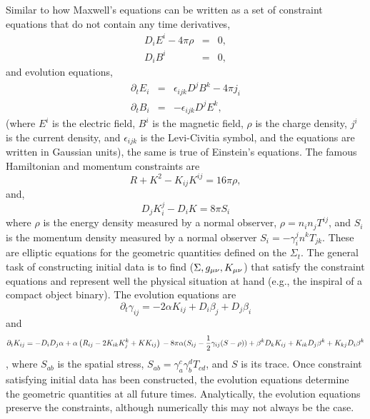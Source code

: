 Similar to how Maxwell's equations can be written as a set of constraint equations that do not contain any time derivatives,
\begin{eqnarray}
D_iE^i -4\pi\rho &=& 0, \\
D_iB^i &=& 0,
\end{eqnarray}
and evolution equations,
\begin{eqnarray}
\partial_tE_i&=&\epsilon_{ijk}D^jB^k - 4\pi j_i\\
\partial_tB_i&=&-\epsilon_{ijk}D^jE^k,
\end{eqnarray}
(where $E^i$ is the electric field, $B^i$ is the magnetic field, $\rho$ is the charge density, $j^i$ is the current density, and $\epsilon_{ijk}$ is the Levi-Civitia symbol, and the equations are written in Gaussian units), the same is true of Einstein's equations. The famous Hamiltonian and momentum constraints are
\begin{equation}
R+K^2-K_{ij}K^{ij}=16\pi\rho,
\end{equation}
and,
\begin{equation}
D_{j}K^{j}_{i}-D_iK=8\pi S_i
\end{equation}
where $\rho$ is the energy density measured by a normal observer, $\rho=n_in_jT^{ij}$, and $S_i$ is the momentum density measured by a normal observer $S_i=-\gamma^{j}_in^kT_{jk}$. These are elliptic equations for the geometric quantities defined on the $\Sigma_t$. The general task of constructing initial data is to find ($\Sigma, g_{\mu\nu}, K_{\mu\nu}$) that satisfy the constraint equations and represent well the physical situation at hand (e.g., the inspiral of a compact object binary). The evolution equations are
\begin{equation}
\partial_t\gamma_{ij}=-2\alpha K_{ij} + D_{i}\beta_j + D_j\beta_i
\end{equation}
and
\begin{equation}
\partial_tK_{ij}=-D_iD_j\alpha + \alpha\left(R_{ij}-2K_{ik}K^k_j+KK_{ij}\right)\\
-8\pi\alpha(S_{ij}-\frac{1}{2}\gamma_{ij}(S-\rho))+\beta^kD_kK_{ij}+K_{ik}D_j\beta^k+K_{kj}D_i\beta^k
\end{equation},
where $S_{ab}$ is the spatial stress, $S_{ab}=\gamma^c_a\gamma^d_bT_{cd}$, and $S$ is its trace. Once constraint satisfying initial data has been constructed, the evolution equations determine the geometric quantities at all future times. Analytically, the evolution equations preserve the constraints, although numerically this may not always be the case. 

